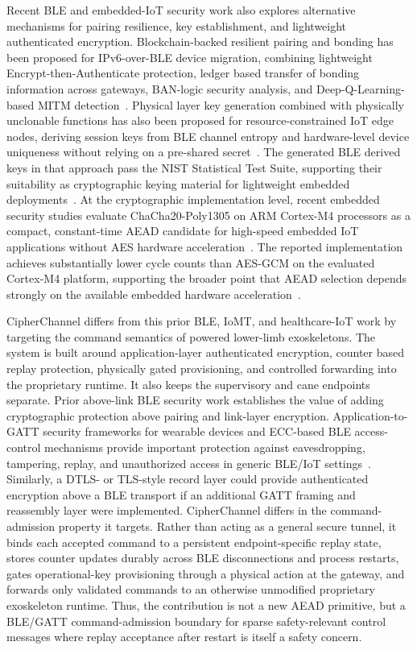 \documentclass[journal]{IEEEtran}
\begin{document}
Recent BLE and embedded-IoT security work also explores alternative mechanisms for pairing resilience, key establishment, and lightweight authenticated encryption.
Blockchain-backed resilient pairing and bonding has been proposed for IPv6-over-BLE device migration, combining lightweight Encrypt-then-Authenticate protection, ledger based transfer of bonding information across gateways, BAN-logic security analysis, and Deep-Q-Learning-based MITM detection~\cite{devi2025blockchainble}.
Physical layer key generation combined with physically unclonable functions has also been proposed for resource-constrained IoT edge nodes, deriving session keys from BLE channel entropy and hardware-level device uniqueness without relying on a pre-shared secret~\cite{hadrich2025plkgpuf}.
The generated BLE derived keys in that approach pass the NIST Statistical Test Suite, supporting their suitability as cryptographic keying material for lightweight embedded deployments~\cite{hadrich2025plkgpuf}.
At the cryptographic implementation level, recent embedded security studies evaluate ChaCha20-Poly1305 on ARM Cortex-M4 processors as a compact, constant-time AEAD candidate for high-speed embedded IoT applications without AES hardware acceleration~\cite{desantis2017chacha20}.
The reported implementation achieves substantially lower cycle counts than AES-GCM on the evaluated Cortex-M4 platform, supporting the broader point that AEAD selection depends strongly on the available embedded hardware acceleration~\cite{desantis2017chacha20}.

CipherChannel differs from this prior BLE, IoMT, and healthcare-IoT work by targeting the command semantics of powered lower-limb exoskeletons.
The system is built around application-layer authenticated encryption, counter based replay protection, physically gated provisioning, and controlled forwarding into the proprietary runtime. It also keeps the supervisory and cane endpoints separate.
Prior above-link BLE security work establishes the value of adding cryptographic protection above pairing and link-layer encryption. Application-to-GATT security frameworks for wearable devices and ECC-based BLE access-control mechanisms provide important protection against eavesdropping, tampering, replay, and unauthorized access in generic BLE/IoT settings~\cite{zhang2019bleframework,cha2017bleiot}. Similarly, a DTLS- or TLS-style record layer could provide authenticated encryption above a BLE transport if an additional GATT framing and reassembly layer were implemented. CipherChannel differs in the command-admission property it targets. Rather than acting as a general secure tunnel, it binds each accepted command to a persistent endpoint-specific replay state, stores counter updates durably across BLE disconnections and process restarts, gates operational-key provisioning through a physical action at the gateway, and forwards only validated commands to an otherwise unmodified proprietary exoskeleton runtime. Thus, the contribution is not a new AEAD primitive, but a BLE/GATT command-admission boundary for sparse safety-relevant control messages where replay acceptance after restart is itself a safety concern.
\end{document}
